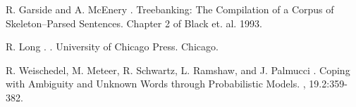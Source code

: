 \begin{thebibliography}{99}
R. Garside and A. McEnery \BBCP.
\newblock Treebanking: The Compilation of a Corpus of Skeleton--Parsed Sentences.
\newblock Chapter 2 of Black et. al. 1993.

R. Long \BBCP.
.
\newblock University of Chicago Press.
\newblock Chicago.

R. Weischedel, M. Meteer, R. Schwartz, L. Ramshaw, and J. Palmucci \BBCP.
\newblock Coping with Ambiguity and Unknown Words through Probabilistic Models.
, 19.2:359-382.


\end{thebibliography}


